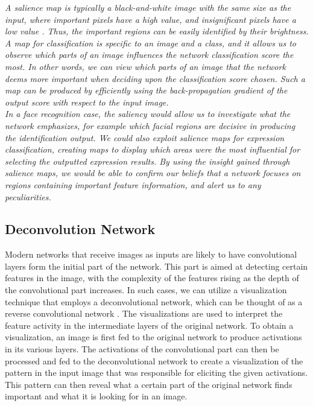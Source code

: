 \textit{A salience map is typically a black-and-white image with the same size as the input, where important pixels have a high value, and insignificant pixels have a low value \cite{salience}. Thus, the important regions can be easily identified by their brightness. A map for classification is specific to an image and a class, and it allows us to observe which parts of an image influences the network classification score the most. In other words, we can view which parts of an image that the network deems more important when deciding upon the classification score chosen. Such a map can be produced by efficiently using the back-propagation gradient of the output score with respect to the input image.} \\

\noindent \textit{In a face recognition case, the saliency would allow us to investigate what the network emphasizes, for example which facial regions are decisive in producing the identification output. We could also exploit salience maps for expression classification, creating maps to display which areas were the most influential for selecting the outputted expression results. By using the insight gained through salience maps, we would be able to confirm our beliefs that a network focuses on regions containing important feature information, and alert us to any peculiarities.}

\subsection{Deconvolution Network}

Modern networks that receive images as inputs are likely to have convolutional layers form the initial part of the network. This part is aimed at detecting certain features in the image, with the complexity of the features rising as the depth of the convolutional part increases. In such cases, we can utilize a visualization technique that employs a deconvolutional network, which can be thought of as a reverse convolutional network \cite{deconv_net}. The visualizations are used to interpret the feature activity in the intermediate layers of the original network. To obtain a visualization, an image is first fed to the original network to produce activations in its various layers. The activations of the convolutional part can then be processed and fed to the deconvolutional network to create a visualization of the pattern in the input image that was responsible for eliciting the given activations. This pattern can then reveal what a certain part of the original network finds important and what it is looking for in an image. \\


